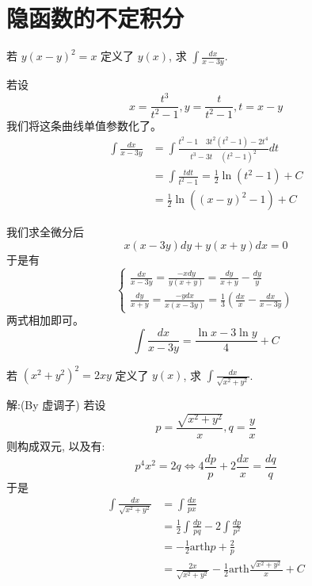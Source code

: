 \documentclass[lang=cn,newtx,10pt,scheme=chinese]{elegantbook}
\renewcommand{\textbf}[1]{\text{\heiti #1}}
\begin{document}
\section{隐函数的不定积分}
\begin{example}
  若 $y(x - y)^2 = x$ 定义了 $y(x)$, 求 $\int \frac{dx}{x - 3y}$.
\end{example}
\begin{solution}
  \textbf{法一：}若设
  $$
  x = \frac{t^3}{t^2 - 1}, y = \frac{t}{t^2 - 1}, t = x - y
  $$
  我们将这条曲线单值参数化了。
  $$
  \begin{aligned}
  \int \frac{dx}{x - 3y} &= \int \frac{t^2 - 1 \quad 3t^2(t^2 - 1) - 2t^4}{t^3 - 3t \quad (t^2 - 1)^2} dt \\
  &= \int \frac{t dt}{t^2 - 1} = \frac{1}{2} \ln(t^2 - 1) + C \\
  &= \frac{1}{2} \ln((x - y)^2 - 1) + C
  \end{aligned}
  $$

  \textbf{法二：}我们求全微分后
  $$
  x (x - 3y) dy + y (x + y) dx = 0
  $$
  于是有
  $$
  \begin{cases}
  \frac{dx}{x - 3y} = \frac{-x dy}{y(x+y)} = \frac{dy}{x+y} - \frac{dy}{y} \\
  \frac{dy}{x+y} = \frac{-y dx}{x(x-3y)} = \frac{1}{3} \left(\frac{dx}{x} - \frac{dx}{x-3y}\right)
  \end{cases}
  $$
  两式相加即可。
  $$
  \int \frac{dx}{x - 3y} = \frac{\ln x - 3 \ln y}{4} + C
  $$
\end{solution}
\begin{example}
  若 $(x^2 + y^2)^2 = 2xy$ 定义了 $y(x)$, 求 $\int \frac{dx}{\sqrt{x^2 + y^2}}$.
\end{example}
\begin{solution}
  解:(By 虚调子) 若设
  $$
  p = \frac{\sqrt{x^2 + y^2}}{x}, q = \frac{y}{x}
  $$
  则构成双元, 以及有:
  $$
  p^4 x^2 = 2q \Leftrightarrow 4 \frac{dp}{p} + 2 \frac{dx}{x} = \frac{dq}{q}
  $$
  于是
  $$
  \begin{aligned}
  \int \frac{dx}{\sqrt{x^2 + y^2}} &= \int \frac{dx}{px} \\
  &= \frac{1}{2} \int \frac{dp}{pq} - 2 \int \frac{dp}{p^2} \\
  &= -\frac{1}{2} \text{arth} p + \frac{2}{p} \\
  &= \frac{2x}{\sqrt{x^2 + y^2}} - \frac{1}{2} \text{arth} \frac{\sqrt{x^2 + y^2}}{x} + C
  \end{aligned}
  $$
\end{solution}
\end{document}
